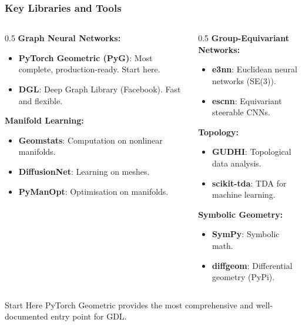 \begin{frame}[fragile]\frametitle{Key Libraries and Tools}

\begin{columns}
\begin{column}{0.5\textwidth}
\textbf{Graph Neural Networks:}
\begin{itemize}
  \item \textbf{PyTorch Geometric (PyG)}: Most complete, production-ready. Start here.
  \item \textbf{DGL}: Deep Graph Library (Facebook). Fast and flexible.
\end{itemize}

\textbf{Manifold Learning:}
\begin{itemize}
  \item \textbf{Geomstats}: Computation on nonlinear manifolds.
  \item \textbf{DiffusionNet}: Learning on meshes.
  \item \textbf{PyManOpt}: Optimisation on manifolds.
\end{itemize}
\end{column}
\begin{column}{0.5\textwidth}
\textbf{Group-Equivariant Networks:}
\begin{itemize}
  \item \textbf{e3nn}: Euclidean neural networks (SE(3)).
  \item \textbf{escnn}: Equivariant steerable CNNs.
\end{itemize}

\textbf{Topology:}
\begin{itemize}
  \item \textbf{GUDHI}: Topological data analysis.
  \item \textbf{scikit-tda}: TDA for machine learning.
\end{itemize}

\textbf{Symbolic Geometry:}
\begin{itemize}
  \item \textbf{SymPy}: Symbolic math.
  \item \textbf{diffgeom}: Differential geometry (PyPi).
\end{itemize}
\end{column}
\end{columns}

\begin{alertblock}{Start Here}
\centering PyTorch Geometric provides the most comprehensive and well-documented entry point for GDL.
\end{alertblock}

\end{frame}
